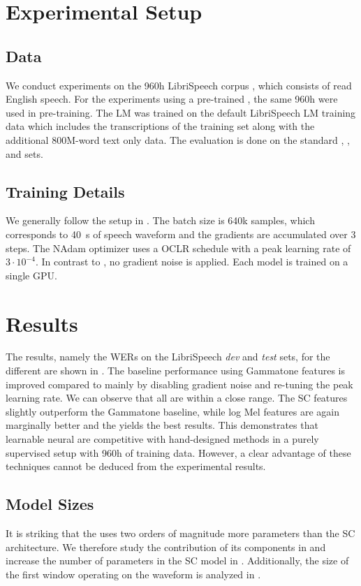 \documentclass{INTERSPEECH2023}
\begin{document}
\section{Experimental Setup}
\subsection{Data}
We conduct experiments on the 960h LibriSpeech corpus \cite{panayotov2015librispeech}, which consists of read English speech.
For the experiments using a pre-trained \wvtwo \fe, the same 960h were used in pre-training.
The \gls{LM} was trained on the default LibriSpeech \gls{LM} training data which includes the transcriptions of the training set along with the additional 800M-word text only data.
The evaluation is done on the standard \devclean, \devother, \testclean and \testother sets.

\subsection{Training Details}
We generally follow the setup in \cite{zhou2022efficient}.
The batch size is 640k samples, which corresponds to \SI{40}{\second} of speech waveform and the gradients are accumulated over 3 steps.
The NAdam optimizer uses a \gls{OCLR} schedule with a peak learning rate of $3\cdot 10^{-4}$.
In contrast to \cite{zhou2022efficient}, no gradient noise is applied.
Each model is trained on a single \gls{GPU}.

\section{Results}
The results, namely the \glspl{WER} on the LibriSpeech \textit{dev} and \textit{test} sets, for the different \fes are shown in .
The baseline performance using Gammatone features is improved compared to \cite{zhou2022efficient} mainly by disabling gradient noise and re-tuning the peak learning rate.
We can observe that all \fes are within a close range.
The \gls{SC} features slightly outperform the Gammatone baseline, while log Mel features are again marginally better and the \wvtwo \fe yields the best results.
This demonstrates that learnable neural \fes are competitive with hand-designed methods in a purely supervised setup with 960h of training data.
However, a clear advantage of these techniques cannot be deduced from the experimental results.


\subsection{Model Sizes}
It is striking that the  \fe uses two orders of magnitude more parameters than the \gls{SC} architecture.
We therefore study the contribution of its components in  and increase the number of parameters in the \gls{SC} model in .
Additionally, the size of the first window operating on the waveform is analyzed in .
\end{document}
